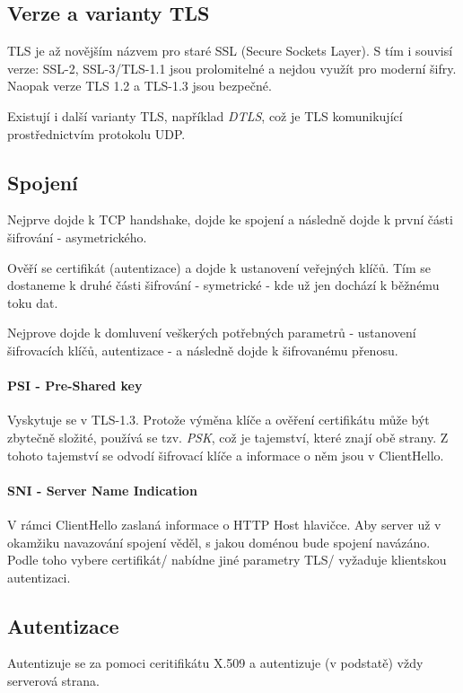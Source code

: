 \documentclass[10pt,a4paper]{article}
\begin{document}
\subsection{Verze a varianty TLS}

TLS je až novějším názvem pro staré SSL (Secure Sockets Layer). S tím i souvisí verze:
SSL-2, SSL-3/TLS-1.1 jsou prolomitelné a nejdou využít pro moderní šifry.
Naopak verze TLS 1.2 a TLS-1.3 jsou bezpečné.

Existují i další varianty TLS, například \textit{DTLS}, což je TLS komunikující prostřednictvím protokolu UDP.

\subsection{Spojení}


Nejprve dojde k TCP handshake, dojde ke spojení a následně dojde k první části šifrování - asymetrického. 

Ověří se certifikát (autentizace) a dojde k ustanovení veřejných klíčů. 
Tím se dostaneme k druhé části šifrování - symetrické - kde už jen dochází k běžnému toku dat.

Nejprove dojde k domluvení veškerých potřebných parametrů - ustanovení šifrovacích klíčů, autentizace - a následně dojde k šifrovanému přenosu.

\paragraph{PSI - Pre-Shared key}
Vyskytuje se v TLS-1.3.
Protože výměna klíče a ověření certifikátu může být zbytečně složité, používá se tzv. \textit{PSK}, což je tajemství, které znají obě strany. 
Z tohoto tajemství se odvodí šifrovací klíče a informace o něm jsou v ClientHello.

\paragraph{SNI - Server Name Indication}
V rámci ClientHello zaslaná informace o HTTP Host hlavičce. 
Aby server už v okamžiku navazování spojení věděl, s jakou doménou bude spojení navázáno.
Podle toho vybere certifikát/ nabídne jiné parametry TLS/ vyžaduje klientskou autentizaci.

\subsection{Autentizace}

Autentizuje se za pomoci ceritifikátu X.509 a autentizuje (v podstatě) vždy serverová strana.
\end{document}
